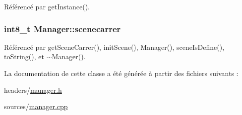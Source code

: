 Référencé par get\-Instance().

\hypertarget{classManager_a5198eb1550a9045c89c24269a34f405a}{
\subsubsection[{scenecarrer}]{\setlength{\rightskip}{0pt plus 5cm}int8\-\_\-t Manager\-::scenecarrer\hspace{0.3cm}{\ttfamily [private]}}}\label{classManager_a5198eb1550a9045c89c24269a34f405a}


Référencé par get\-Scene\-Carrer(), init\-Scene(), Manager(), scene\-Is\-Define(), to\-String(), et $\sim$\-Manager().



La documentation de cette classe a été générée à partir des fichiers suivants \-:\begin{DoxyCompactItemize}
\item 
headers/\hyperlink{manager_8h}{manager.\-h}\item 
sources/\hyperlink{manager_8cpp}{manager.\-cpp}\end{DoxyCompactItemize}
